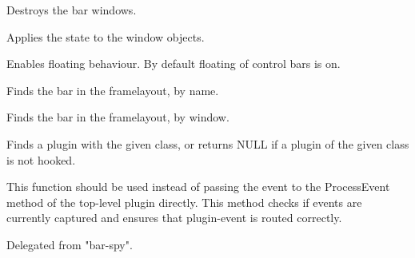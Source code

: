 
Destroys the bar windows.


\label{wxframelayoutdosetbarstate}


Applies the state to the window objects.


\label{wxframelayoutenablefloating}


Enables floating behaviour. By default floating of control bars is on.


\label{wxframelayoutfindbarbyname}


Finds the bar in the framelayout, by name.


\label{wxframelayoutfindbarbywindow}


Finds the bar in the framelayout, by window.


\label{wxframelayoutfindplugin}


Finds a plugin with the given class, or returns NULL if a plugin of the given
class is not hooked.


\label{wxframelayoutfirepluginevent}


This function should be used instead of passing the event to the ProcessEvent method
of the top-level plugin directly. This method checks if events are currently
captured and ensures that plugin-event is routed correctly.


\label{wxframelayoutforwardmouseevent}


Delegated from "bar-spy".


